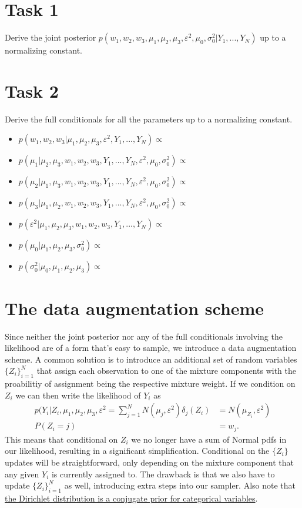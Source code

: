 \documentclass{article}
\begin{document}
\section*{Task 1}

Derive the joint posterior $p(w_1,w_2,w_3,\mu_1,\mu_2,\mu_3,\varepsilon^2,\mu_0,\sigma_0^2|Y_1,...,Y_N)$ up to a normalizing constant.

\section*{Task 2}

Derive the full conditionals for all the parameters up to a normalizing constant.
\begin{itemize}
\item $p(w_1,w_2,w_3|\mu_1,\mu_2,\mu_3,\varepsilon^2,Y_1,...,Y_N) \propto$
\item $p(\mu_1|\mu_2,\mu_3,w_1,w_2,w_3,Y_1,...,Y_N,\varepsilon^2,\mu_0,\sigma_0^2) \propto$
\item $p(\mu_2|\mu_1,\mu_3,w_1,w_2,w_3,Y_1,...,Y_N,\varepsilon^2,\mu_0,\sigma_0^2) \propto$
\item $p(\mu_3|\mu_1,\mu_2,w_1,w_2,w_3,Y_1,...,Y_N,\varepsilon^2,\mu_0,\sigma_0^2) \propto$
\item $p(\varepsilon^2|\mu_1,\mu_2,\mu_3,w_1,w_2, w_3,Y_1,...,Y_N) \propto$
\item $p(\mu_0|\mu_1,\mu_2,\mu_3,\sigma_0^2) \propto$
\item $p(\sigma_0^2|\mu_0,\mu_1,\mu_2,\mu_3) \propto$
\end{itemize}

\section*{The data augmentation scheme}

Since neither the joint posterior nor any of the full conditionals involving the likelihood are of a form that's easy to sample, we introduce a data augmentation scheme. A common solution is to introduce an additional set of random variables ${\{Z_i\}}_{i=1}^N$ that assign each observation to one of the mixture components with the proabilitiy of assignment being the respective mixture weight. If we condition on $Z_i$ we can then write the likelihood of $Y_i$ as
\begin{align*} 
p(Y_i|Z_i,\mu_1,\mu_2,\mu_3,\varepsilon^2 = \sum_{j=1}^N N(\mu_j,\varepsilon^2)\delta_{j}(Z_i) &= N(\mu_{Z_i},\varepsilon^2) \\
P(Z_i = j ) &= w_j.
\end{align*}
This means that conditional on $Z_i$ we no longer have a sum of Normal pdfs in our likelihood, resulting in a significant simplification. Conditional on the $\{Z_i\}$ updates will be straightforward, only depending on the mixture component that any given $Y_i$ is currently assigned to. The drawback is that we also have to update ${\{Z_i\}}_{i=1}^N$ as well, introducing extra steps into our sampler. Also note that \href{https://en.wikipedia.org/wiki/Dirichlet_distribution#Conjugate_to_categorical.2Fmultinomial}{the Dirichlet distribution is a conjugate prior for categorical variables}. 
\end{document}
